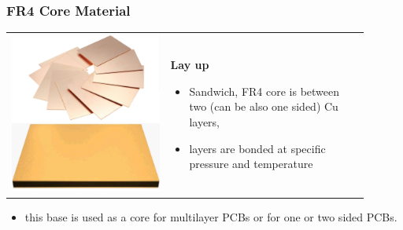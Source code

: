 \documentclass{beamer}
\begin{document}
	\begin{frame}
    \frametitle{FR4 Core Material}

		\begin{center}
			\begin{tabular}{m{0.4\linewidth} m{0.5\linewidth}}
			\includegraphics[scale=0.12]{obr02_jadro.png} & \textbf{Lay up}
			\begin{itemize}
				\item Sandwich, FR4 core is between two (can be also one sided) Cu layers,
				\item layers are bonded at specific pressure and temperature
			\end{itemize}
			\end{tabular}
		\end{center}
		
		\begin{itemize}
			\item this base is used as a core for multilayer PCBs or for one or two sided PCBs.
		\end{itemize}
	\end{frame}
\end{document}
